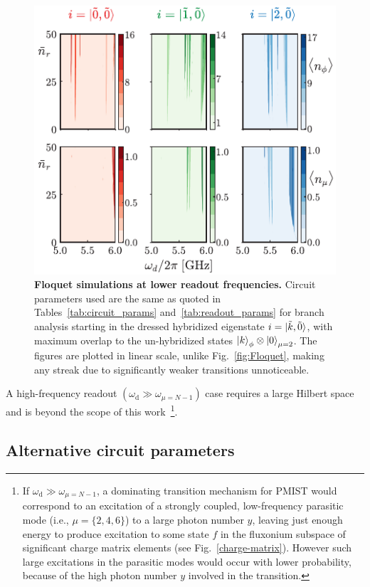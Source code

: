 \documentclass[%
reprint,
superscriptaddress,
 amsmath,amssymb,
 aps,
 prx,
longbibliography,
floatfix,
]{revtex4-2}
\begin{document}
\begin{figure}[t]
    \centering
    \includegraphics[width=\linewidth]{Figures/Floquet_low.pdf}
    \caption{{\bf Floquet simulations at lower readout frequencies.} Circuit parameters used are the same as quoted in Tables~\ref{tab:circuit_params} and~\ref{tab:readout_params} for branch analysis starting in the dressed hybridized eigenstate $i=\ket{\tilde{k},\tilde{0}}$, with maximum overlap to the un-hybridized states $\ket{k}_\phi\otimes\ket{0}_{\mu=2}$. The figures are plotted in linear scale, unlike Fig.~\ref{fig:Floquet}, making any streak due to significantly weaker transitions unnoticeable.}
    \label{fig:Flo_low}
\end{figure}

A high-frequency readout $(\omega_\textrm{d}\gg \omega_{\mu=N-1})$ case requires a large Hilbert space and is beyond the scope of this work~\footnote{If  $\omega_\textrm{d}\gg \omega_{\mu=N-1}$, a dominating transition mechanism for PMIST would correspond to an excitation of a strongly coupled, low-frequency parasitic mode (i.e., $\mu=\{2,4,6\}$) to a large photon number $y$, leaving just enough energy to produce excitation to some state $f$ in the fluxonium subspace of significant charge matrix elements (see Fig.~\ref{charge-matrix}). However such large excitations in the parasitic modes would occur with lower probability, because of the high photon number $y$ involved in the transition.}. 


\subsection{Alternative circuit parameters}\label{Will_circuit}
\end{document}
